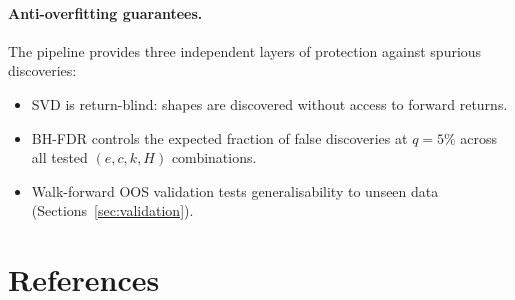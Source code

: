 \documentclass[11pt,a4paper]{article}
\theoremstyle{definition}
\theoremstyle{plain}
\begin{document}
\paragraph{Anti-overfitting guarantees.}
The pipeline provides three independent layers of protection against spurious discoveries:
\begin{itemize}
    \item[(i)] SVD is return-blind: shapes are discovered without access to forward
               returns.
    \item[(ii)] BH-FDR controls the expected fraction of false discoveries at $q = 5\%$
               across all tested $(e, c, k, H)$ combinations.
    \item[(iii)] Walk-forward OOS validation tests generalisability to unseen data
                 (Sections~\ref{sec:validation}).
\end{itemize}

\section*{References}
\end{document}
